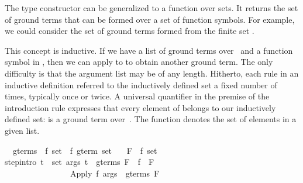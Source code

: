 \begin{isabellebody}
\begin{isamarkuptext}
The type constructor  can be generalized to a function 
over sets.  It returns 
the set of ground terms that can be formed over a set  of function symbols. For
example,  we could consider the set of ground terms formed from the finite 
set .

This concept is inductive. If we have a list  of ground terms 
over~ and a function symbol  in , then we 
can apply  to  to obtain another ground term. 
The only difficulty is that the argument list may be of any length. Hitherto, 
each rule in an inductive definition referred to the inductively 
defined set a fixed number of times, typically once or twice. 
A universal quantifier in the premise of the introduction rule 
expresses that every element of  belongs
to our inductively defined set: is a ground term 
over~.  The function  denotes the set of elements in a given 
list.%
\end{isamarkuptext}%
\isamarkuptrue%
\isamarkupfalse%
\isanewline
\ \ gterms\ {}{}\ {}{}f\ set\ {}\ {}f\ gterm\ set{}\isanewline
\ \ \ F\ {}{}\ {}{}f\ set{}\isanewline
{}\isanewline
step{}intro{}{}{}\ {}{}{}t\ {}\ set\ args{}\ t\ {}\ gterms\ F{}\ \ f\ {}\ F{}\isanewline
\ \ \ \ \ \ \ \ \ \ \ \ \ \ \ {}\ {}Apply\ f\ args{}\ {}\ gterms\ F{}%

\end{isabellebody}
